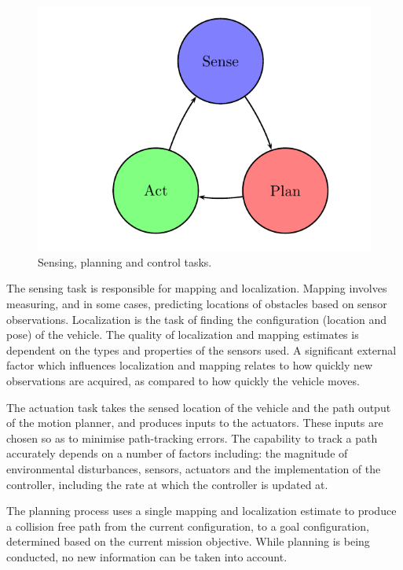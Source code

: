 \begin{figure}[!htb]
\begin{center}
\includegraphics[scale=0.280]{img/motion_planning/sense_plan_control_tasks_cycle.jpeg}
\end{center}
\caption{ Sensing, planning and control tasks.}
\label{sense_plan_control_tasks_cycle}
\end{figure}

The sensing task is responsible for mapping and localization. Mapping involves measuring,
and in some cases, predicting locations of obstacles based on sensor observations. Localization
is the task of finding the configuration (location and pose) of the vehicle. The quality of
localization and mapping estimates is dependent on the types and properties of the sensors
used. A significant external factor which influences localization and mapping relates to how
quickly new observations are acquired, as compared to how quickly the vehicle moves.

The actuation task takes the sensed location of the vehicle and the path output of the motion planner, 
and produces inputs to the actuators. These inputs are chosen so as to minimise
path-tracking errors. The capability to track a path accurately depends on a number of factors
including: the magnitude of environmental disturbances, sensors, actuators and the implementation of the controller, 
including the rate at which the controller is updated at.

The planning process uses a single mapping and localization estimate to produce a collision
free path from the current configuration, to a goal configuration, determined based on the
current mission objective. While planning is being conducted, no new information can be
taken into account.

